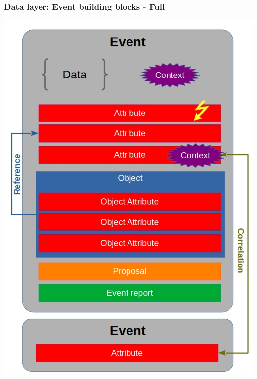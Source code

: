 \begin{frame}
    \frametitle{Data layer: Event building blocks - Full}
        \begin{center}
            \includegraphics[scale=0.30]{screenshots/event-building-blocks/full.png}
        \end{center}
\end{frame}


